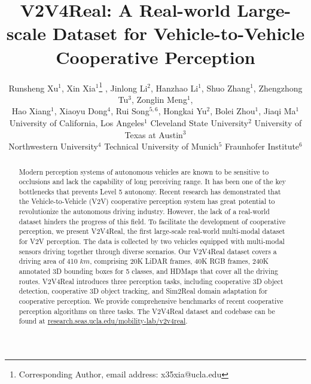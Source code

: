 \documentclass[10pt,twocolumn,letterpaper]{article}
\begin{document}
\title{V2V4Real: A Real-world Large-scale Dataset for Vehicle-to-Vehicle Cooperative Perception}

\author{
Runsheng Xu$^{1}$, Xin Xia$^{1}$\thanks{Corresponding Author, email address: x35xia@ucla.edu}
, Jinlong Li$^{2}$, Hanzhao Li$^{1}$, Shuo Zhang$^{1}$, Zhengzhong Tu$^{3}$, Zonglin Meng$^{1}$, \\ Hao Xiang$^{1}$, Xiaoyu Dong$^{4}$, Rui Song$^{5,6}$, Hongkai Yu$^{2}$, Bolei Zhou$^{1}$,  Jiaqi Ma$^{1}$ \vspace{2mm}
\\ University of California, Los Angeles$^{1}$   \hspace{2mm} Cleveland State University$^{2}$ \hspace{2mm}  University of Texas at Austin$^{3}$ 
\\ Northwestern University$^{4}$  \hspace{2mm} Technical University of Munich$^{5}$  \hspace{2mm} Fraunhofer Institute$^{6}$%
}
\maketitle

\begin{abstract}
Modern perception systems of autonomous vehicles are known to be sensitive to occlusions and lack the capability of long perceiving range. It has been one of the key bottlenecks that prevents Level 5 autonomy. Recent research has demonstrated that the Vehicle-to-Vehicle (V2V) cooperative perception system has great potential to revolutionize the autonomous driving industry. However, the lack of a real-world dataset hinders the progress of this field. To facilitate the development of cooperative perception, we present V2V4Real, the first large-scale real-world multi-modal dataset for V2V perception. The data is collected by two vehicles equipped with multi-modal sensors driving together through diverse scenarios.  Our V2V4Real dataset covers a driving area of 410 $km$, comprising 20K LiDAR frames, 40K RGB frames, 240K annotated 3D bounding boxes for 5 classes, and HDMaps that cover all the driving routes. V2V4Real introduces three perception tasks, including cooperative 3D object detection, cooperative 3D object tracking, and Sim2Real domain adaptation for cooperative perception. We provide comprehensive benchmarks of recent cooperative perception algorithms on three tasks. The V2V4Real dataset and codebase can be found at \href{https://research.seas.ucla.edu/mobility-lab/v2v4real}{research.seas.ucla.edu/mobility-lab/v2v4real}.

\end{abstract}
\end{document}

